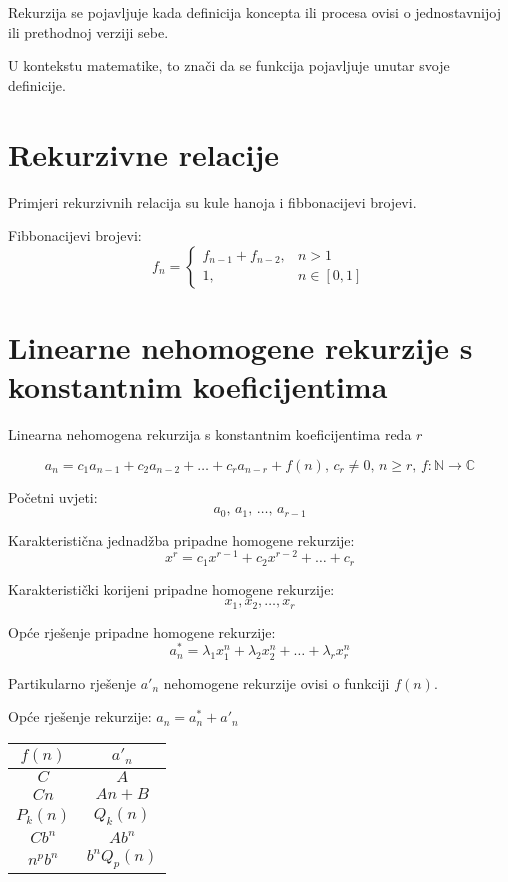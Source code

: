 Rekurzija se pojavljuje kada definicija koncepta ili procesa ovisi o
jednostavnijoj ili prethodnoj verziji sebe.

U kontekstu matematike, to znači da se funkcija pojavljuje unutar svoje
definicije.

\section{Rekurzivne relacije}

Primjeri rekurzivnih relacija su kule hanoja i fibbonacijevi brojevi.

Fibbonacijevi brojevi:
$$
    f_n = \begin{cases}
        f_{n-1} + f_{n-2},& n > 1\\
        1,& n \in [0, 1]
    \end{cases}
$$

\section{Linearne nehomogene rekurzije s konstantnim koeficijentima}

Linearna nehomogena rekurzija s konstantnim koeficijentima reda $r$

$$
a_n = c_1a_{n-1}+c_2a_{n-2}+\dots+c_ra_{n-r}+f(n),\, c_r \neq 0,\, n \geq r,\, f: \mathbb{N} \to \mathbb{C}
$$

Početni uvjeti:
$$
a_0,\, a_1,\, \dots,\, a_{r-1}
$$

Karakteristična jednadžba pripadne homogene rekurzije:
$$
x^r = c_1x^{r-1}+c_2x^{r-2}+\dots+c_r
$$

Karakteristički korijeni pripadne homogene rekurzije:
$$
x_1,x_2,\dots,x_r
$$

Opće rješenje pripadne homogene rekurzije:
$$
a_n^* = \lambda_1x_1^n+\lambda_2x_2^n+\dots+\lambda_rx_r^n
$$

Partikularno rješenje $a'_n$ nehomogene rekurzije ovisi o funkciji $f(n)$.

Opće rješenje rekurzije: $\displaystyle a_n = a_n^*+a'_n$

\begin{center}
    \begin{tabular}{c|c}
        $f(n)$ & $a'_n$ \\
        \hline
        $C$ & $A$ \\
        $Cn$ & $An+B$ \\
        $P_k(n)$ & $Q_k(n)$ \\
        $Cb^n$ & $Ab^n$ \\
        $n^pb^n$ & $b^nQ_p(n)$
    \end{tabular}
\end{center}

